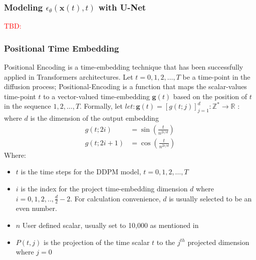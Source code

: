 \documentclass[11pt]{article}
\begin{document}
    \subsubsection{Modeling $\epsilon_{\theta}(\mathbf{x}(t),t)$ with U-Net}
    \textcolor{red}{TBD: \cite{ho2020denoising,sohldickstein2015deep_diffusion_model_main_paper}}

    \subsubsection{Positional Time Embedding}\label{subsubsec:positional-time-encoding}
    Positional Encoding is a time-embedding technique that has been successfully applied in Transformers architectures\cite{lin2021survey}.
    Let $t=0,1,2,\dots,T$ be a time-point in the diffusion process; Positional-Encoding is a function that maps
    the scalar-values time-point $t$ to a vector-valued time-embedding $\mathbf{g}(t)$ based on the position of
    $t$ in the sequence $1,2,\dots,T$.
    Formally, let $let : \mathbf{g}(t)=[g(t;j)]_{j=1}^{d} :\mathbb{Z}^{*} \rightarrow \mathbb{R}$ :
    where $d$ is the dimension of the output embedding
    \begin{equation}
        \begin{aligned}
            g(t; 2 i) & =\sin \left(\frac{t}{n^{2 i / d}}\right) \\
            g(t; 2 i+1) & =\cos \left(\frac{t}{n^{2 i / d}}\right)
        \end{aligned}
        \label{eq:positional_encoding}
    \end{equation}
    Where:
    \begin{itemize}
        \item $t$ is the time steps for the DDPM model, $t= 0,1,2,\dots,T$
        \item $i$ is the index for the project time-embedding dimension $d$ where $i=0,1,2,..,\frac{d}{2} -2$.
        For calculation convenience, $d$ is usually selected to be an even number.
        \item $n$ User defined scalar, usually set to 10,000 as mentioned in
        \item $P(t,j)$ is the projection of the time scalar $t$ to the $j^{th}$ projected dimension where $j=0$
    \end{itemize}
\end{document}
